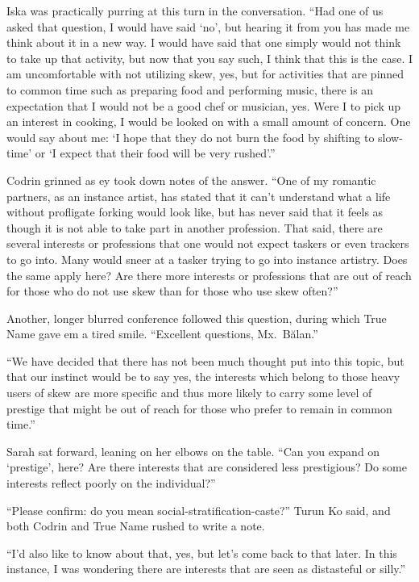 Iska was practically purring at this turn in the conversation. ``Had one of us asked that question, I would have said `no', but hearing it from you has made me think about it in a new way. I would have said that one simply would not think to take up that activity, but now that you say such, I think that this is the case. I am uncomfortable with not utilizing skew, yes, but for activities that are pinned to common time such as preparing food and performing music, there is an expectation that I would not be a good chef or musician, yes. Were I to pick up an interest in cooking, I would be looked on with a small amount of concern. One would say about me: `I hope that they do not burn the food by shifting to slow-time' or `I expect that their food will be very rushed'.''

Codrin grinned as ey took down notes of the answer. ``One of my romantic partners, as an instance artist, has stated that it can't understand what a life without profligate forking would look like, but has never said that it feels as though it is not able to take part in another profession. That said, there are several interests or professions that one would not expect taskers or even trackers to go into. Many would sneer at a tasker trying to go into instance artistry. Does the same apply here? Are there more interests or professions that are out of reach for those who do not use skew than for those who use skew often?''

Another, longer blurred conference followed this question, during which True Name gave em a tired smile. ``Excellent questions, Mx.~Bălan.''

``We have decided that there has not been much thought put into this topic, but that our instinct would be to say yes, the interests which belong to those heavy users of skew are more specific and thus more likely to carry some level of prestige that might be out of reach for those who prefer to remain in common time.''

Sarah sat forward, leaning on her elbows on the table. ``Can you expand on `prestige', here? Are there interests that are considered less prestigious? Do some interests reflect poorly on the individual?''

``Please confirm: do you mean social-stratification-caste?'' Turun Ko said, and both Codrin and True Name rushed to write a note.

``I'd also like to know about that, yes, but let's come back to that later. In this instance, I was wondering there are interests that are seen as distasteful or silly.''

